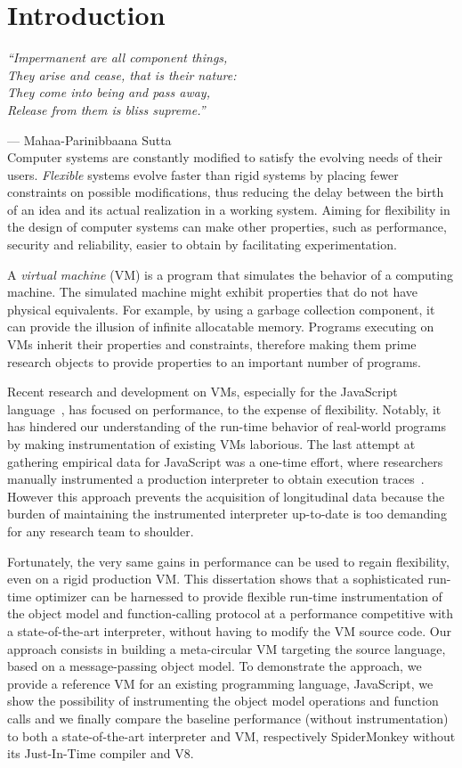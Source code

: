 \chapter{Introduction}

\emph{``Impermanent are all component things,\\
They arise and cease, that is their nature:\\
They come into being and pass away,\\
Release from them is bliss supreme.''} 

--- Mahaa-Parinibbaana Sutta \cite{1988last} \\

Computer systems are constantly modified to satisfy the evolving needs of their
users. \textit{Flexible} systems evolve faster than rigid systems by placing fewer
constraints on possible modifications, thus reducing the delay between the
birth of an idea and its actual realization in a working system. Aiming for
flexibility in the design of computer systems can make other properties, such as
performance, security and reliability, easier to obtain by facilitating
experimentation.

A \textit{virtual machine} (VM) is a program that simulates the behavior of a
computing machine.  The simulated machine might exhibit properties that do not
have physical equivalents. For example, by using a garbage collection
component, it can provide the illusion of infinite allocatable memory. Programs
executing on VMs inherit their properties and constraints, therefore making
them prime research objects to provide properties to an important number of
programs.

Recent research and development on VMs, especially for the JavaScript
language~\cite{js_spec}, has focused on performance, to the expense of
flexibility. Notably, it has hindered our understanding of the run-time
behavior of real-world programs by making instrumentation of existing VMs
laborious. The last attempt at gathering empirical data for JavaScript was a
one-time effort, where researchers manually instrumented a production
interpreter to obtain execution traces~\cite{behavior_js}. However this
approach prevents the acquisition of longitudinal data because the burden of
maintaining the instrumented interpreter up-to-date is too demanding for any
research team to shoulder.

Fortunately, the very same gains in performance can be used to regain
flexibility, even on a rigid production VM. This dissertation shows that a
sophisticated run-time optimizer can be harnessed to provide flexible run-time
instrumentation of the object model and function-calling protocol at a
performance competitive with a state-of-the-art interpreter, without having to
modify the VM source code. Our approach consists in building a meta-circular VM
targeting the source language, based on a message-passing object model. To
demonstrate the approach, we provide a reference VM for an existing programming
language, JavaScript, we show the possibility of instrumenting the object model
operations and function calls and we finally compare the baseline performance
(without instrumentation) to both a state-of-the-art interpreter and VM,
respectively SpiderMonkey without its Just-In-Time compiler and V8.

